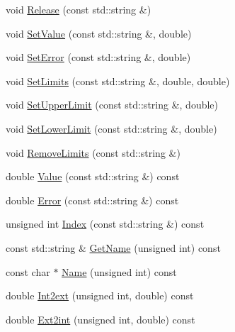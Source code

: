 \begin{DoxyCompactItemize}
\item 
void \mbox{\hyperlink{classROOT_1_1Minuit2_1_1MnUserParameterState_ae35c9bfa1e967c16542143a99a6f03eb}{Release}} (const std\+::string \&)
\item 
void \mbox{\hyperlink{classROOT_1_1Minuit2_1_1MnUserParameterState_abc93cf38ae05fdbb8472c1b5d589e947}{Set\+Value}} (const std\+::string \&, double)
\item 
void \mbox{\hyperlink{classROOT_1_1Minuit2_1_1MnUserParameterState_a7960c179d85d1595f02772c4a8dff85f}{Set\+Error}} (const std\+::string \&, double)
\item 
void \mbox{\hyperlink{classROOT_1_1Minuit2_1_1MnUserParameterState_ab178dda717939b16da948c96d2180b89}{Set\+Limits}} (const std\+::string \&, double, double)
\item 
void \mbox{\hyperlink{classROOT_1_1Minuit2_1_1MnUserParameterState_ab61a4e78b23aa76315662cf9bd07a012}{Set\+Upper\+Limit}} (const std\+::string \&, double)
\item 
void \mbox{\hyperlink{classROOT_1_1Minuit2_1_1MnUserParameterState_afc9466eb6db8e8f07309dcd7a760d116}{Set\+Lower\+Limit}} (const std\+::string \&, double)
\item 
void \mbox{\hyperlink{classROOT_1_1Minuit2_1_1MnUserParameterState_ac71dfd669559be76ed62fdf221a017d5}{Remove\+Limits}} (const std\+::string \&)
\item 
double \mbox{\hyperlink{classROOT_1_1Minuit2_1_1MnUserParameterState_a02135107320f1ce5680fe25cf406f08f}{Value}} (const std\+::string \&) const
\item 
double \mbox{\hyperlink{classROOT_1_1Minuit2_1_1MnUserParameterState_a74ae393362454df2808936090391560f}{Error}} (const std\+::string \&) const
\item 
unsigned int \mbox{\hyperlink{classROOT_1_1Minuit2_1_1MnUserParameterState_a2301d51ec17effc44792821d4482cb14}{Index}} (const std\+::string \&) const
\item 
const std\+::string \& \mbox{\hyperlink{classROOT_1_1Minuit2_1_1MnUserParameterState_a6740898dda45c1f6f485a0a82ce63618}{Get\+Name}} (unsigned int) const
\item 
const char $\ast$ \mbox{\hyperlink{classROOT_1_1Minuit2_1_1MnUserParameterState_afe93ae6453653734e45f0d66d64a609c}{Name}} (unsigned int) const
\item 
double \mbox{\hyperlink{classROOT_1_1Minuit2_1_1MnUserParameterState_a4ade4b298d85f6192ffa7d7723aa5b97}{Int2ext}} (unsigned int, double) const
\item 
double \mbox{\hyperlink{classROOT_1_1Minuit2_1_1MnUserParameterState_a8e0b79e3a150b2ccd15678755b1adb4a}{Ext2int}} (unsigned int, double) const

\end{DoxyCompactItemize}
